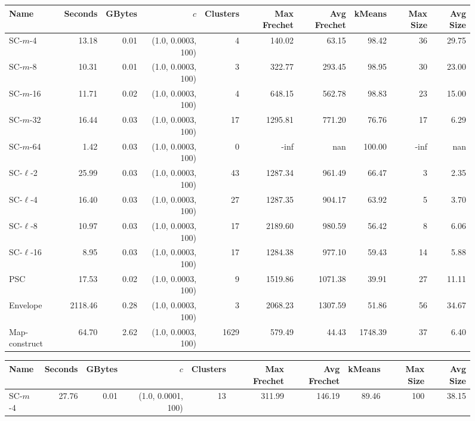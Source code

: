 \documentclass[11pt]{article}
\begin{document}
    \begin{figure} \begin{center}
    \begin{minipage}{\textwidth}
    {
    \begin{tabular}{@{}lrrrrrrrrr@{}}
        \toprule
        Name & Seconds & GBytes & $c$ & Clusters & Max Frechet & Avg Frechet & kMeans & Max Size & Avg Size\\
        \midrule
        SC-$m$-4 & 13.18 & 0.01 & (1.0, 0.0003, 100) & 4 & 140.02 & 63.15 & 98.42 & 36 & 29.75\\
SC-$m$-8 & 10.31 & 0.01 & (1.0, 0.0003, 100) & 3 & 322.77 & 293.45 & 98.95 & 30 & 23.00\\
SC-$m$-16 & 11.71 & 0.02 & (1.0, 0.0003, 100) & 4 & 648.15 & 562.78 & 98.83 & 23 & 15.00\\
SC-$m$-32 & 16.44 & 0.03 & (1.0, 0.0003, 100) & 17 & 1295.81 & 771.20 & 76.76 & 17 & 6.29\\
SC-$m$-64 & 1.42 & 0.03 & (1.0, 0.0003, 100) & 0 & -inf & nan & 100.00 & -inf & nan\\
SC-$\ell$-2 & 25.99 & 0.03 & (1.0, 0.0003, 100) & 43 & 1287.34 & 961.49 & 66.47 & 3 & 2.35\\
SC-$\ell$-4 & 16.40 & 0.03 & (1.0, 0.0003, 100) & 27 & 1287.35 & 904.17 & 63.92 & 5 & 3.70\\
SC-$\ell$-8 & 10.97 & 0.03 & (1.0, 0.0003, 100) & 17 & 2189.60 & 980.59 & 56.42 & 8 & 6.06\\
SC-$\ell$-16 & 8.95 & 0.03 & (1.0, 0.0003, 100) & 17 & 1284.38 & 977.10 & 59.43 & 14 & 5.88\\
PSC & 17.53 & 0.02 & (1.0, 0.0003, 100) & 9 & 1519.86 & 1071.38 & 39.91 & 27 & 11.11\\
Envelope & 2118.46 & 0.28 & (1.0, 0.0003, 100) & 3 & 2068.23 & 1307.59 & 51.86 & 56 & 34.67\\
Map-construct & 64.70 & 2.62 & (1.0, 0.0003, 100) & 1629 & 579.49 & 44.43 & 1748.39 & 37 & 6.40\\
        \bottomrule
    \end{tabular}
    }
    {
    \begin{tabular}{@{}lrrrrrrrrr@{}}
        \toprule
        Name & Seconds & GBytes & $c$ & Clusters & Max Frechet & Avg Frechet & kMeans & Max Size & Avg Size\\
        \midrule
        SC-$m$-4 & 27.76 & 0.01 & (1.0, 0.0001, 100) & 13 & 311.99 & 146.19 & 89.46 & 100 & 38.15\\

\end{tabular}}
\end{minipage}
\end{center}
\end{figure}
\end{document}
